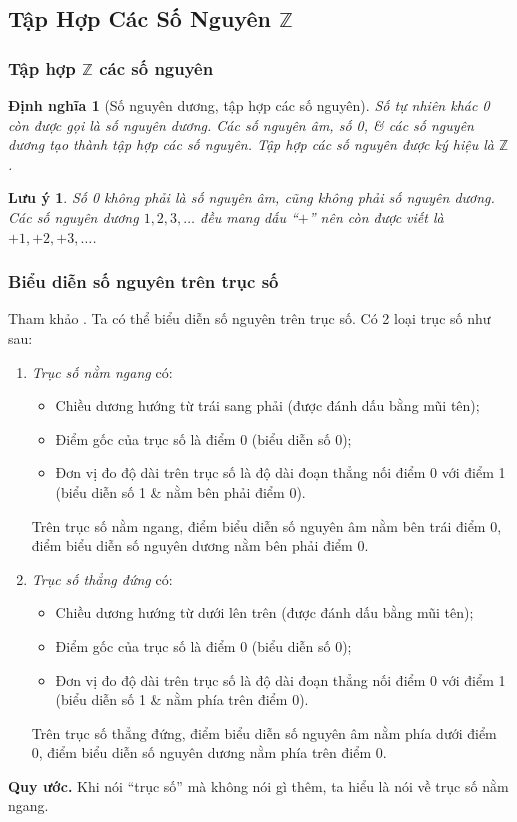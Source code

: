 \documentclass{article}
\numberwithin{equation}{section}
\newtheorem{definition}{Định nghĩa}[section]
\newtheorem{remark}{Lưu ý}[section]
\begin{document}
\subsection{Tập Hợp Các Số Nguyên $\mathbb{Z}$}

\subsubsection{Tập hợp $\mathbb{Z}$ các số nguyên}

\begin{definition}[Số nguyên dương, tập hợp các số nguyên]
	Số tự nhiên khác 0 còn được gọi là \emph{số nguyên dương}. Các số nguyên âm, số 0, \& các số nguyên dương tạo thành tập hợp các số nguyên. Tập hợp các số nguyên được ký hiệu là $\mathbb{Z}$.
\end{definition}

\begin{remark}
	Số 0 không phải là số nguyên âm, cũng không phải số nguyên dương. Các số nguyên dương $1,2,3,\ldots$ đều mang dấu ``$+$'' nên còn được viết là $+1,+2,+3,\ldots$.
\end{remark}

\subsubsection{Biểu diễn số nguyên trên trục số}
Tham khảo \cite[pp. 65--66]{Thai_Anh_Dat_Ha_Loan_Nam_Quang_Toan_6_tap_1}. Ta có thể biểu diễn số nguyên trên trục số. Có 2 loại trục số như sau:
\begin{enumerate}
	\item \textit{Trục số nằm ngang} có:
	\begin{itemize}
		\item Chiều dương hướng từ trái sang phải (được đánh dấu bằng mũi tên);
		\item Điểm gốc của trục số là điểm 0 (biểu diễn số 0);
		\item Đơn vị đo độ dài trên trục số là độ dài đoạn thẳng nối điểm 0 với điểm 1 (biểu diễn số 1 \& nằm bên phải điểm 0).
	\end{itemize}
	Trên trục số nằm ngang, điểm biểu diễn số nguyên âm nằm bên trái điểm 0, điểm biểu diễn số nguyên dương nằm bên phải điểm 0.
	\item \textit{Trục số thẳng đứng} có:
	\begin{itemize}
		\item Chiều dương hướng từ dưới lên trên (được đánh dấu bằng mũi tên);
		\item Điểm gốc của trục số là điểm 0 (biểu diễn số 0);
		\item Đơn vị đo độ dài trên trục số là độ dài đoạn thẳng nối điểm 0 với điểm 1 (biểu diễn số 1 \& nằm phía trên điểm 0).
	\end{itemize}
	Trên trục số thẳng đứng, điểm biểu diễn số nguyên âm nằm phía dưới điểm 0, điểm biểu diễn số nguyên dương nằm phía trên điểm 0.
\end{enumerate}
\noindent\textbf{Quy ước.} Khi nói ``trục số'' mà không nói gì thêm, ta hiểu là nói về trục số nằm ngang.
\end{document}
